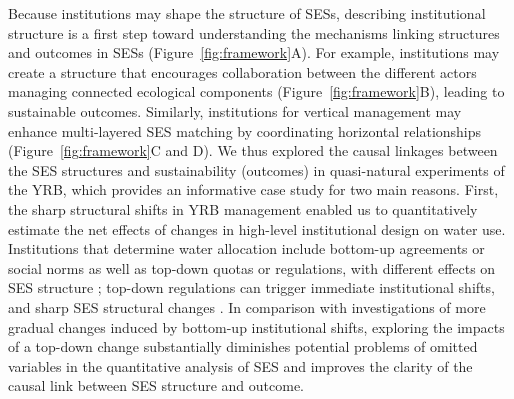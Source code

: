 Because institutions may shape the structure of SESs, describing institutional structure is a first step toward understanding the mechanisms linking structures and outcomes in SESs (Figure~\ref{fig:framework}A).
For example, institutions may create a structure that encourages collaboration between the different actors managing connected ecological components (Figure~\ref{fig:framework}B), leading to sustainable outcomes.
Similarly, institutions for vertical management may enhance multi-layered SES matching by coordinating horizontal relationships (Figure~\ref{fig:framework}C and D).
We thus explored the causal linkages between the SES structures and sustainability (outcomes) in quasi-natural experiments of the YRB, which provides an informative case study for two main reasons.
First, the sharp structural shifts in YRB management enabled us to quantitatively estimate the net effects of changes in high-level institutional design on water use. Institutions that determine water allocation include bottom-up agreements or social norms as well as top-down quotas or regulations, with different effects on SES structure \cite{wangAlignmentsocialecological2019,speedBasinwaterallocation2013}; top-down regulations can trigger immediate institutional shifts, and sharp SES structural changes \cite{speedBasinwaterallocation2013,rolandUnderstandinginstitutionalchange2004}.
In comparison with investigations of more gradual changes induced by bottom-up institutional shifts, exploring the impacts of a top-down change substantially diminishes potential problems of omitted variables in the quantitative analysis of SES and improves the clarity of the causal link between SES structure and outcome.
